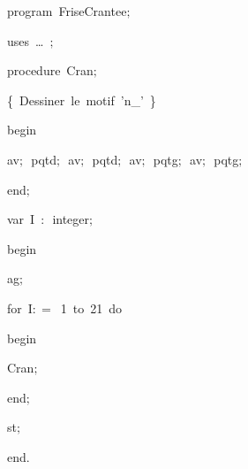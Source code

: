 
{
\parindent {}
\medskip

\carrenoir
\vspace{\neglskip}\mbox{\blc  \idt  \mcl program\idt \ FriseCrantee$;$
}\par 
\vspace{\neglskip}\mbox{\blc \blk\idt \mcl uses\idt \ \ldots\ $;$
}\par 
\medskip

\pagebreak[3] 
\vspace{\neglskip}\mbox{\blc  \blk\idt  \mcl procedure\idt \ Cran$;$}\par 
\vspace{\neglskip}\mbox{\blc  \blk\blk\idt  \cmt  \{\ Dessiner\ le\ motif\ {'}n\_{'}\ \}\idt }\par 
\vspace{\neglskip}\mbox{\blc  \blk\idt  \mcl begin\idt }\par 
\vspace{\neglskip}\mbox{\blc  \blk\blk\blk\idt  av$;$\ pqtd$;$\ av$;$\ pqtd$;$\ av$;$\ pqtg$;$\ av$;$\ pqtg$;$}\par 
\vspace{\neglskip}\mbox{\blc  \blk\idt  \mcl end\idt $;$}\par 
\medskip

\pagebreak[3] 
\vspace{\neglskip}\mbox{\blc  \blk\idt  \mcl var\idt \ I\ $:$\ integer$;$}\par 
\medskip

\vspace{\neglskip}\mbox{\blc  \idt  \mcl begin\idt }\par 
\vspace{\neglskip}\mbox{\blc  \blk\idt  ag$;$\ }\par 
\pagebreak[3] 
\vspace{\neglskip}\mbox{\blc  \blk\idt  \mcl for\idt \ I$:$$=$\ 1\ \mcl to\idt \ 21\ \mcl do\idt }\par 
\vspace{\neglskip}\mbox{\blc  \blk\blk\idt  \mcl begin\idt \ }\par 
\vspace{\neglskip}\mbox{\blc  \blk\blk\blk\idt  Cran$;$}\par 
\vspace{\neglskip}\mbox{\blc  \blk\blk\idt  \mcl end\idt $;$}\par 
\vspace{\neglskip}\mbox{\blc  \blk\idt  st$;$}\par 
\vspace{\neglskip}\mbox{\blc  \idt  \mcl end\idt $.$}\par 

\medskip }

